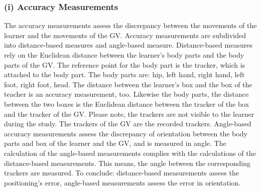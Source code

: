 \subsubsection{(i) Accuracy Measurements}
The accuracy measurements assess the discrepancy between the movements of the learner and the movements of the GV. Accuracy measurements are subdivided into distance-based measures and angle-based measure. Distance-based measures rely on the Euclidean distance between the learner's body parts and the body parts of the GV. The reference point for the body part is the tracker, which is attached to the body part. The body parts are: hip, left hand, right hand, left foot, right foot, head. The distance between the learner's box and the box of the teacher is an accuracy measurement, too. Likewise the body parts, the distance between the two boxes is the Euclidean distance between the tracker of the box and the tracker of the GV. Please note, the trackers are not visible to the learner during the study. The trackers of the GV are the recorded trackers. Angle-based accuracy measurements assess the discrepancy of orientation between the body parts and box of the learner and the GV, and is measured in angle. The calculation of the angle-based measurements complies with the calculations of the distance-based measurements. This means, the angle between the corresponding trackers are measured. To conclude: distance-based measurements assess the positioning's error, angle-based measurements assess the error in orientation.

